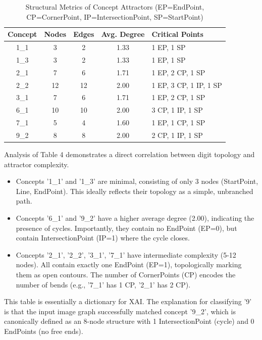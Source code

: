 \documentclass[conference]{IEEEtran}
\begin{document}
\begin{table}[h]
\centering
\caption{Structural Metrics of Concept Attractors (EP=EndPoint, CP=CornerPoint, IP=IntersectionPoint, SP=StartPoint)}
\begin{tabular}{ccccl}
\toprule
\textbf{Concept} & \textbf{Nodes} & \textbf{Edges} & \textbf{Avg. Degree} & \textbf{Critical Points} \\
\midrule
1\_1 & 3 & 2 & 1.33 & 1 EP, 1 SP \\
1\_3 & 3 & 2 & 1.33 & 1 EP, 1 SP \\
2\_1 & 7 & 6 & 1.71 & 1 EP, 2 CP, 1 SP \\
2\_2 & 12 & 12 & 2.00 & 1 EP, 3 CP, 1 IP, 1 SP \\
3\_1 & 7 & 6 & 1.71 & 1 EP, 2 CP, 1 SP \\
6\_1 & 10 & 10 & 2.00 & 3 CP, 1 IP, 1 SP \\
7\_1 & 5 & 4 & 1.60 & 1 EP, 1 CP, 1 SP \\
9\_2 & 8 & 8 & 2.00 & 2 CP, 1 IP, 1 SP \\
\bottomrule
\end{tabular}
\end{table}

Analysis of Table 4 demonstrates a direct correlation between digit topology and attractor complexity.
\begin{itemize}
    \item Concepts '1\_1' and '1\_3' are minimal, consisting of only 3 nodes (StartPoint, Line, EndPoint). This ideally reflects their topology as a simple, unbranched path.
    \item Concepts '6\_1' and '9\_2' have a higher average degree (2.00), indicating the presence of cycles. Importantly, they contain no EndPoint (EP=0), but contain IntersectionPoint (IP=1) where the cycle closes.
    \item Concepts '2\_1', '2\_2', '3\_1', '7\_1' have intermediate complexity (5-12 nodes). All contain exactly one EndPoint (EP=1), topologically marking them as open contours. The number of CornerPoints (CP) encodes the number of bends (e.g., '7\_1' has 1 CP, '2\_1' has 2 CP).
\end{itemize}

This table is essentially a dictionary for XAI. The explanation for classifying '9' is that the input image graph successfully matched concept '9\_2', which is canonically defined as an 8-node structure with 1 IntersectionPoint (cycle) and 0 EndPoints (no free ends).
\end{document}
